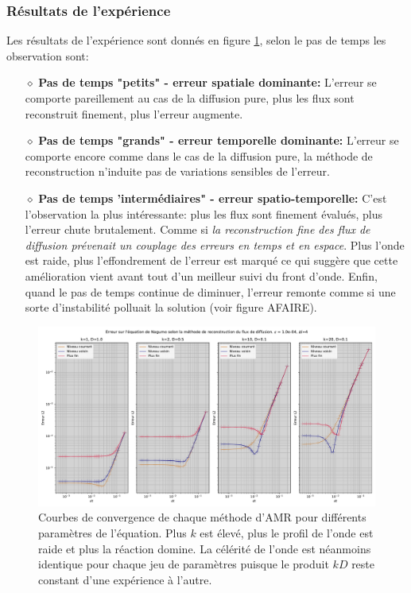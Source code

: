 \subsubsection{Résultats de l'expérience}
Les résultats de l'expérience sont donnés en figure \ref{fig:flux_reconstruction_nagumo}, selon le pas de temps les observation sont:
\begin{itemize}
    \item[$\diamond$] \textbf{Pas de temps "petits" - erreur spatiale dominante:} L'erreur se comporte pareillement au cas de la diffusion pure, plus les flux sont reconstruit finement, plus l'erreur augmente.
    \item[$\diamond$] \textbf{Pas de temps "grands" - erreur temporelle dominante:} L'erreur se comporte encore comme dans le cas de la diffusion pure, la méthode de reconstruction n'induite pas de variations sensibles de l'erreur.
    \item[$\diamond$] \textbf{Pas de temps 'intermédiaires" - erreur spatio-temporelle: } C'est l'observation la plus intéressante: plus les flux sont finement évalués, plus l'erreur chute brutalement. 
            Comme si \textit{la reconstruction fine des flux de diffusion prévenait un couplage des erreurs en temps et en espace}. Plus l'onde est raide, plus l'effondrement de l'erreur est marqué
            ce qui suggère que cette amélioration vient avant tout d'un meilleur suivi du front d'onde. Enfin, quand le pas de temps continue de diminuer, l'erreur remonte comme si 
            une sorte d'instabilité polluait la solution (voir figure AFAIRE). 
\end{itemize}
\begin{figure}[h!]
    \centering
    \includegraphics[width=\textwidth]{media/4_travail/3/flux_reconstruction_method_nagumo.pdf}
    \caption{Courbes de convergence de chaque méthode d'AMR pour différents paramètres de l'équation. Plus $k$ est élevé, plus le profil de l'onde est raide et plus la réaction domine. La célérité de l'onde est néanmoins identique pour chaque jeu de paramètres puisque le produit $kD$ reste constant d'une expérience à l'autre.}
    \label{fig:flux_reconstruction_nagumo}
\end{figure}